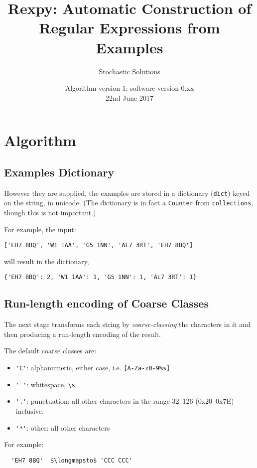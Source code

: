 \documentclass{article}
\begin{document}
\title{Rexpy: Automatic Construction of Regular Expressions from Examples}
\author{Stochastic Solutions}
\date{Algorithm version 1; software version 0.xx\\22nd June 2017}

\section{Algorithm}

\subsection{Examples Dictionary}

However they are supplied, the examples are stored in a dictionary
(\verb+dict+) keyed on the string, in unicode. (The dictionary is in
fact a \verb+Counter+ from \verb+collections+, though this is not important.)

For example, the input:

\begin{verbatim}
['EH7 8BQ', 'W1 1AA', 'G5 1NN', 'AL7 3RT', 'EH7 8BQ']
\end{verbatim}

will result in the dictionary,
\begin{verbatim}
{'EH7 8BQ': 2, 'W1 1AA': 1, 'G5 1NN': 1, 'AL7 3RT': 1}
\end{verbatim}

\subsection{Run-length encoding of Coarse Classes}

The next stage transforms each string by {\it coarse-classing\/}
the characters in it and then producing a run-length encoding of the result.

The default coarse classes are:
\begin{itemize}
  \item \verb+'C'+: alphanumeric, either case, i.e. \verb+[A-Za-z0-9%s]+
  \item \verb+' '+: whitespace, \verb+\s+
  \item \verb+'.'+: punctuation: all other characters in the range
                    32--126 (0x20--0x7E) inclusive.
  \item \verb+'*'+: other: all other characters
\end{itemize}

For example:
\begin{verbatim}
  'EH7 8BQ'  $\longmapsto$ 'CCC CCC'
\end{verbatim}
\end{document}
